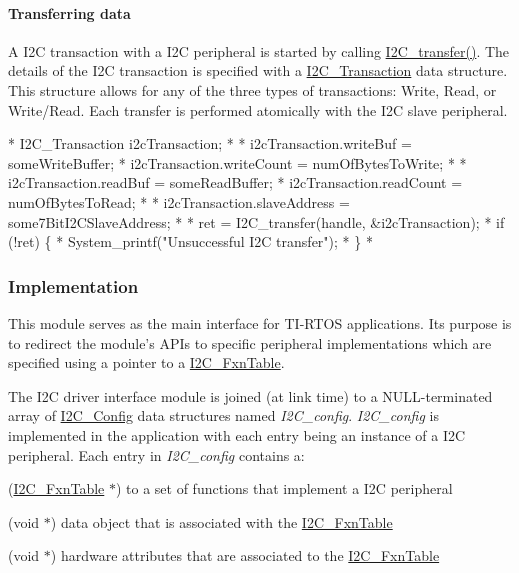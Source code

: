 \paragraph*{Transferring data}

A I2\-C transaction with a I2\-C peripheral is started by calling \hyperlink{_i2_c_8h_ac5d827b67fe77d7d179026941cc069d7}{I2\-C\-\_\-transfer()}. The details of the I2\-C transaction is specified with a \hyperlink{struct_i2_c___transaction}{I2\-C\-\_\-\-Transaction} data structure. This structure allows for any of the three types of transactions\-: Write, Read, or Write/\-Read. Each transfer is performed atomically with the I2\-C slave peripheral.


\begin{DoxyCode}
*  I2C_Transaction i2cTransaction;
*
*  i2cTransaction.writeBuf = someWriteBuffer;
*  i2cTransaction.writeCount = numOfBytesToWrite;
*
*  i2cTransaction.readBuf = someReadBuffer;
*  i2cTransaction.readCount = numOfBytesToRead;
*
*  i2cTransaction.slaveAddress = some7BitI2CSlaveAddress;
*
*  ret = I2C_transfer(handle, &i2cTransaction);
*  \textcolor{keywordflow}{if} (!ret) \{
*      System\_printf(\textcolor{stringliteral}{"Unsuccessful I2C transfer"});
*  \}
*  
\end{DoxyCode}


\subsubsection*{Implementation}

This module serves as the main interface for T\-I-\/\-R\-T\-O\-S applications. Its purpose is to redirect the module's A\-P\-Is to specific peripheral implementations which are specified using a pointer to a \hyperlink{struct_i2_c___fxn_table}{I2\-C\-\_\-\-Fxn\-Table}.

The I2\-C driver interface module is joined (at link time) to a N\-U\-L\-L-\/terminated array of \hyperlink{struct_i2_c___config}{I2\-C\-\_\-\-Config} data structures named {\itshape I2\-C\-\_\-config}. {\itshape I2\-C\-\_\-config} is implemented in the application with each entry being an instance of a I2\-C peripheral. Each entry in {\itshape I2\-C\-\_\-config} contains a\-:
\begin{DoxyItemize}
\item (\hyperlink{struct_i2_c___fxn_table}{I2\-C\-\_\-\-Fxn\-Table} $\ast$) to a set of functions that implement a I2\-C peripheral
\item (void $\ast$) data object that is associated with the \hyperlink{struct_i2_c___fxn_table}{I2\-C\-\_\-\-Fxn\-Table}
\item (void $\ast$) hardware attributes that are associated to the \hyperlink{struct_i2_c___fxn_table}{I2\-C\-\_\-\-Fxn\-Table}
\end{DoxyItemize}

